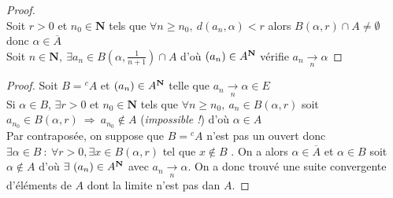 		
		\begin{proof} ~\\
		\fbox{$\Leftarrow$} Soit $r>0$ et $n_0\in\mathbf{N}$ tels que $\forall n\geq n_0 ,~d(a_n,\alpha ) <r$ 
		alors $B(\alpha , r) \cap A \neq \emptyset$ donc $\alpha \in \overline{A}$ \\ 
		\fbox{$\Rightarrow$} Soit $n\in \mathbf{N} , ~\exists a_n \in B(\alpha, \frac{1}{n+1} ) \cap A$ d'où $(a_n) \in A^{\mathbf{N}}$ 
		vérifie $a_n \underset{n}{\to} \alpha$	
		\end{proof} \medskip
		
		
		\begin{proof}
		\fbox{$\Rightarrow$} Soit $B={^cA}$ et $(a_n) \in A^{\mathbf{N}}$ telle que $a_n \underset{n}{\to} \alpha\in E$ \\
		Si $\alpha \in B$, $\exists r>0$ et $n_0\in\mathbf{N}$ tels que $\forall n\geq n_0 ,~a_n\in B(\alpha ,r)$ soit $a_{n_0} \in B(\alpha ,r)~
		\Rightarrow ~a_{n_0}\notin A$ (\emph{impossible !}) d'où $\alpha\in A$\\
		\fbox{$\Leftarrow$} Par contraposée, on suppose que $B={^cA} $ n'est pas un ouvert donc $\exists \alpha \in B ~:~ 
		\forall r>0, 
		 \exists x\in B(\alpha,r)$ tel que $x\notin B$ . On a alors $\alpha\in\overline{A}$ et $\alpha\in B$ soit $\alpha \notin A$
		d'où $\exists~(a_n) \in A^{\mathbf{N}}$ avec $a_n \underset{n}{\to} \alpha$. On a donc trouvé une suite convergente d'éléments de $A$ 
		dont la limite n'est pas dan $A$.
		\end{proof} \medskip
		
		 \medskip
		
		\label{2.1.5} \medskip
		
		 \medskip
		
